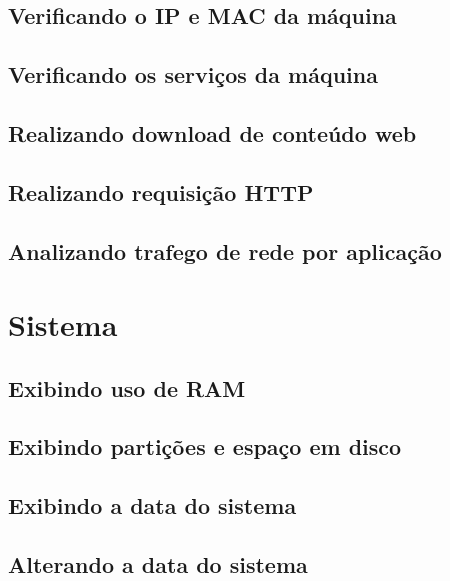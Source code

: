 \documentclass[a4paper,9pt]{extarticle}
\begin{document}
\begin{multicols}{2}
\subsection{Verificando o IP e MAC da máquina}

	
\subsection{Verificando os serviços da máquina}
	

\subsection{Realizando download de conteúdo web}
	 
	
\subsection{Realizando requisição HTTP}
\subsection{Analizando trafego de rede por aplicação}

\section{Sistema}
\subsection{Exibindo uso de RAM}
	
	
\subsection{Exibindo partições e espaço em disco}
	

\subsection{Exibindo a data do sistema}
	
	
\subsection{Alterando a data do sistema}

\end{multicols}
\end{document}
